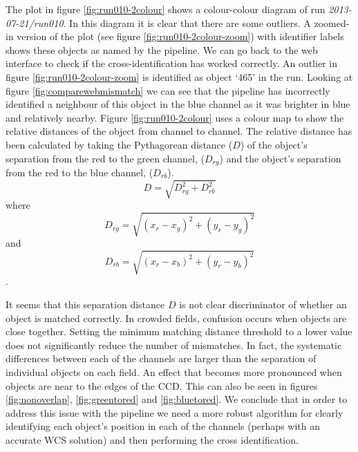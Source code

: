 The plot in figure \ref{fig:run010-2colour} shows a colour-colour diagram of run \emph{2013-07-21/run010}. In this diagram it is clear that there are some outliers. A zoomed-in version of the plot (see figure \ref{fig:run010-2colour-zoom}) with identifier labels shows these objects as named by the pipeline. We can go back to the web interface to check if the cross-identification has worked correctly. An outlier in figure \ref{fig:run010-2colour-zoom} is identified as object `465' in the run. Looking at figure \ref{fig:comparewebmismatch} we can see that the pipeline has incorrectly identified a neighbour of this object in the blue channel as it was brighter in blue and relatively nearby. Figure \ref{fig:run010-2colour} uses a colour map to show the relative distances of the object from channel to channel. The relative distance has been calculated by taking the Pythagorean distance ($D$) of the object's separation from the red to the green channel, ($D_{rg}$) and the object's separation from the red to the blue channel, ($D_{rb}$).  \begin{equation}D = \sqrt{ D_{rg}^2 + D_{rb}^2}\end{equation}where \begin{equation}D_{rg} = \sqrt{ (x_r - x_g)^2 + (y_r - y_g)^2}\end{equation} and \begin{equation}D_{rb} = \sqrt{ (x_r - x_b)^2 + (y_r - y_b)^2} \end{equation}.

It seems that this separation distance $D$ is not clear discriminator of whether an object is matched correctly. In crowded fields, confusion occurs when objects are close together. Setting the minimum matching distance threshold to a lower value does not significantly reduce the number of mismatches. In fact, the systematic differences between each of the channels are larger than the separation of individual objects on each field. An effect that becomes more pronounced when objects are near to the edges of the CCD. This can also be seen in figures  \ref{fig:nonoverlap}, \ref{fig:greentored} and \ref{fig:bluetored}.  We conclude that in order to address this issue with the pipeline we need a more robust algorithm for clearly identifying each object's position in each of the channels (perhaps with an accurate WCS solution) and then performing the cross identification. 

